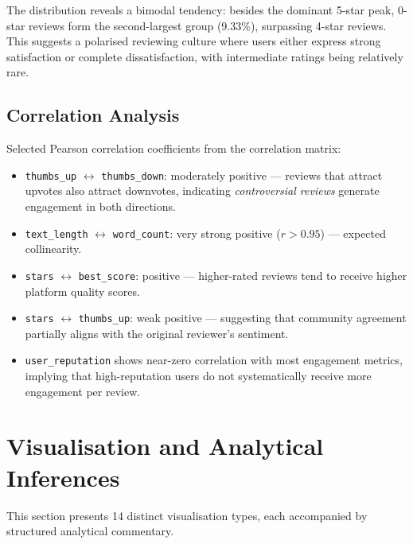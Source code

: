 \documentclass[12pt,a4paper]{article}
\begin{document}
The distribution reveals a bimodal tendency: besides the dominant 5-star peak, 0-star reviews form the second-largest group (9.33\%), surpassing 4-star reviews. This suggests a polarised reviewing culture where users either express strong satisfaction or complete dissatisfaction, with intermediate ratings being relatively rare.

\subsection{Correlation Analysis}

Selected Pearson correlation coefficients from the correlation matrix:

\begin{itemize}[nosep]
    \item \texttt{thumbs\_up} $\leftrightarrow$ \texttt{thumbs\_down}: moderately positive --- reviews that attract upvotes also attract downvotes, indicating \emph{controversial reviews} generate engagement in both directions.
    \item \texttt{text\_length} $\leftrightarrow$ \texttt{word\_count}: very strong positive ($r > 0.95$) --- expected collinearity.
    \item \texttt{stars} $\leftrightarrow$ \texttt{best\_score}: positive --- higher-rated reviews tend to receive higher platform quality scores.
    \item \texttt{stars} $\leftrightarrow$ \texttt{thumbs\_up}: weak positive --- suggesting that community agreement partially aligns with the original reviewer's sentiment.
    \item \texttt{user\_reputation} shows near-zero correlation with most engagement metrics, implying that high-reputation users do not systematically receive more engagement per review.
\end{itemize}

\section{Visualisation and Analytical Inferences}

This section presents 14 distinct visualisation types, each accompanied by structured analytical commentary.

\end{document}
